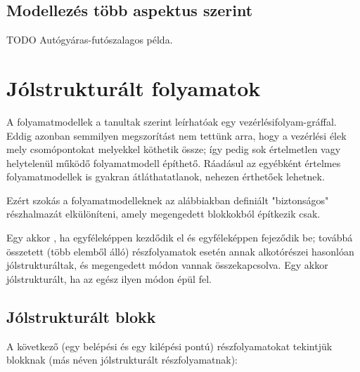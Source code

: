 \subsection{Modellezés több aspektus szerint}
TODO Autógyáras-futószalagos példa.

\section{Jólstrukturált folyamatok}\label{sec:jolstrukturalt-folyamatok}

A folyamatmodellek a tanultak szerint leírhatóak egy vezérlésifolyam-gráffal. Eddig azonban semmilyen megszorítást nem tettünk arra, hogy a vezérlési élek mely csomópontokat melyekkel köthetik össze; így pedig sok értelmetlen vagy helytelenül működő folyamatmodell építhető. Ráadásul az egyébként értelmes folyamatmodellek is gyakran átláthatatlanok, nehezen érthetőek lehetnek.

Ezért szokás a folyamatmodelleknek az alábbiakban definiált "biztonságos" részhalmazát elkülöníteni, amely megengedett blokkokból építkezik csak.

\begin{definicio}
	Egy  akkor , ha egyféleképpen kezdődik el és egyféleképpen fejeződik be; továbbá összetett (több elemből álló) részfolyamatok esetén annak alkotórészei hasonlóan jólstrukturáltak, és megengedett módon vannak összekapcsolva. Egy  akkor jólstrukturált, ha az egész ilyen módon épül fel.
\end{definicio}

\subsection{Jólstrukturált blokk}

A következő (egy belépési és egy kilépési pontú) részfolyamatokat tekintjük  blokknak (más néven jólstrukturált részfolyamatnak):


